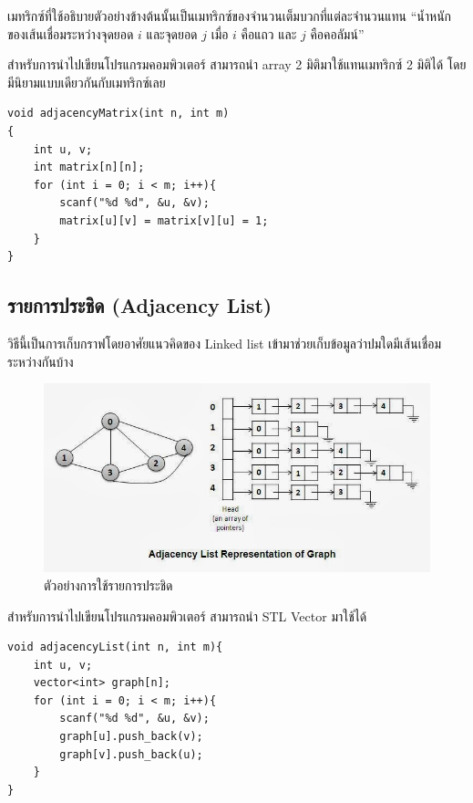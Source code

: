 เมทริกซ์ที่ใช้อธิบายตัวอย่างข้างต้นนั้นเป็นเมทริกซ์ของจำนวนเต็มบวกที่แต่ละจำนวนแทน ``น้ำหนักของเส้นเชื่อมระหว่างจุดยอด $i$  และจุดยอด $j$ เมื่อ $i$ คือแถว และ $j$ คือคอลัมน์''

สำหรับการนำไปเขียนโปรแกรมคอมพิวเตอร์ สามารถนำ array 2 มิติมาใช้แทนเมทริกซ์ 2 มิติได้ โดยมีนิยามแบบเดียวกันกับเมทริกซ์เลย

\begin{lstlisting}
void adjacencyMatrix(int n, int m)
{
	int u, v;
	int matrix[n][n];
	for (int i = 0; i < m; i++){
		scanf("%d %d", &u, &v);
		matrix[u][v] = matrix[v][u] = 1;
	}
}
\end{lstlisting}

\newpage

\subsection{รายการประชิด (Adjacency List)}

วิธีนี้เป็นการเก็บกราฟโดยอาศัยแนวคิดของ Linked list เข้ามาช่วยเก็บข้อมูลว่าปมใดมีเส้นเชื่อมระหว่างกันบ้าง

\begin{figure}[h!]
	\centering
    \includegraphics[width=13cm]{images/adjacency-list}
    \caption{ตัวอย่างการใช้รายการประชิด}
    \label{fig:adjacency_list}
\end{figure}

สำหรับการนำไปเขียนโปรแกรมคอมพิวเตอร์ สามารถนำ STL Vector มาใช้ได้

\begin{lstlisting}
void adjacencyList(int n, int m){
	int u, v;
	vector<int> graph[n];
	for (int i = 0; i < m; i++){
		scanf("%d %d", &u, &v);
		graph[u].push_back(v);
		graph[v].push_back(u);
	}
}
\end{lstlisting}